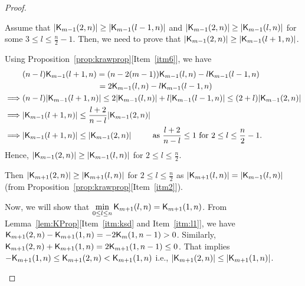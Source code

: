 \documentclass{llncs}
\begin{document}
\begin{proof}
\begin{enumerate}
\begin{enumerate}
Assume that $|\mathsf{K}_{m-1}(2,n)| \geq |\mathsf{K}_{m-1}(l-1,n)|$ and $|\mathsf{K}_{m-1}(2,n)| \geq |\mathsf{K}_{m-1}(l,n)|$ for some $3 \leq l \leq \frac{n}{2}-1$. Then, we need to prove that $|\mathsf{K}_{m-1}(2,n)| \geq |\mathsf{K}_{m-1}(l+1,n)|$.

Using Proposition~\ref{prop:krawprop}[Item~\ref{itm6}], we have 
\begin{align*}
& (n-l)\mathsf{K}_{m-1}(l+1,n) = (n-2(m-1)) \mathsf{K}_{m-1}(l,n) - l\mathsf{K}_{m-1}(l-1,n) \\
& ~~~~~~~~~~~~~~~~~~~~~~~~~~~~ = 2\mathsf{K}_{m-1}(l,n) - l\mathsf{K}_{m-1}(l-1,n) \\
\implies & (n-l)|\mathsf{K}_{m-1}(l+1,n)| \leq 2|\mathsf{K}_{m-1}(l,n)| + l|\mathsf{K}_{m-1}(l-1,n)| \leq (2+l)|\mathsf{K}_{m-1}(2,n)| \\
\implies & |\mathsf{K}_{m-1}(l+1,n)| \leq \frac{l+2}{n-l}|\mathsf{K}_{m-1}(2,n)| \\
\implies & |\mathsf{K}_{m-1}(l+1,n)| \leq |\mathsf{K}_{m-1}(2,n)| ~~~~~~~\text{ as } \frac{l+2}{n-l} \leq 1 \text{ for } 2 \leq l \leq \frac{n}{2}-1.
\end{align*}
Hence, $|\mathsf{K}_{m-1}(2,n)| \geq |\mathsf{K}_{m-1}(l,n)|$ for $2 \leq l \leq \frac{n}{2}$.

Then $|\mathsf{K}_{m+1}(2,n)| \geq |\mathsf{K}_{m+1}(l,n)|$ for $2 \leq l \leq \frac{n}{2}$ as $|\mathsf{K}_{m+1}(l,n)|=|\mathsf{K}_{m-1}(l,n)|$ (from Proposition~\ref{prop:krawprop}[Item~\ref{itm2}]).

Now, we will show that $\min\limits_{0 \leq l \leq n }\mathsf{K}_{m + 1}(l,n) = \mathsf{K}_{m + 1}(1,n)$. 
From Lemma~\ref{lem:KProp}[Item~\ref{itm:ksd} and Item~\ref{itm:l1}], we have $\mathsf{K}_{m+1}(2,n) - \mathsf{K}_{m+1}(1,n) = -2 \mathsf{K}_{m}(1,n-1) > 0$. Similarly, $\mathsf{K}_{m+1}(2,n) + \mathsf{K}_{m+1}(1,n) = 2 \mathsf{K}_{m+1}(1,n-1) \leq 0$. That implies $-\mathsf{K}_{m+1}(1,n) \leq \mathsf{K}_{m+1}(2,n) < \mathsf{K}_{m+1}(1,n)$ i.e., $|\mathsf{K}_{m+1}(2,n)| \leq |\mathsf{K}_{m+1}(1,n)|$.


\end{enumerate}
\end{enumerate}
\end{proof}
\end{document}
